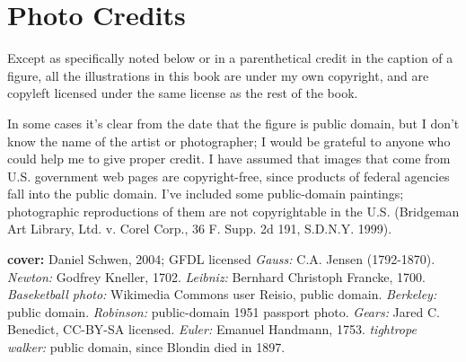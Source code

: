 \chapter{Photo Credits}

\footnotesize

Except as specifically noted below or in a parenthetical credit in the
caption of a figure, all the illustrations in this book are
under my own copyright, and are copyleft licensed under the same license
as the rest of the book. 

In some cases it's clear from the date that the
figure is public domain, but I don't know the name of the artist or photographer; I would
be grateful to anyone who could help me to give proper credit.
I have assumed that images
that come from U.S. government web pages are copyright-free, since products
of federal agencies fall into the public domain.
I've included some
public-domain paintings; photographic reproductions of them are not
copyrightable in the U.S. (Bridgeman Art Library, Ltd. v. Corel Corp.,
36 F. Supp. 2d 191, S.D.N.Y. 1999).

\begin{sloppypar}
\noindent

\newcommand{\photocredit}[1]{\footnotesize{(\textit{#1})}}%
\newcommand{\docred}[3]{\textbf{#1} \emph{#2:} #3.\quad}
\newcommand{\cred}[3]{\docred{\pageref{fig:#1}}{#2}{#3}}
\newcommand{\credtwo}[4]{\docred{\pageref{fig:#1},\pageref{fig:#2}}{#3}{#4}}
\newcommand{\credthree}[5]{\docred{\pageref{fig:#1},\pageref{fig:#2},\pageref{fig:#3}}{#4}{#5}}

\textbf{cover:} Daniel Schwen, 2004; GFDL licensed
\cred{gauss}{Gauss}{C.A. Jensen (1792-1870)}
\cred{newton}{Newton}{Godfrey Kneller, 1702}
\cred{leibniz}{Leibniz}{Bernhard Christoph Francke, 1700}
\cred{basketball}{Baseketball photo}{Wikimedia Commons user Reisio, public domain}
\cred{berkeley}{Berkeley}{public domain}
\cred{robinson}{Robinson}{public-domain 1951 passport photo}
\cred{gear-ratio}{Gears}{Jared C. Benedict, CC-BY-SA licensed}%
\cred{euler}{Euler}{Emanuel Handmann, 1753}
\cred{blondin}{tightrope walker}{public domain, since Blondin died in 1897}

\end{sloppypar}\normalsize
